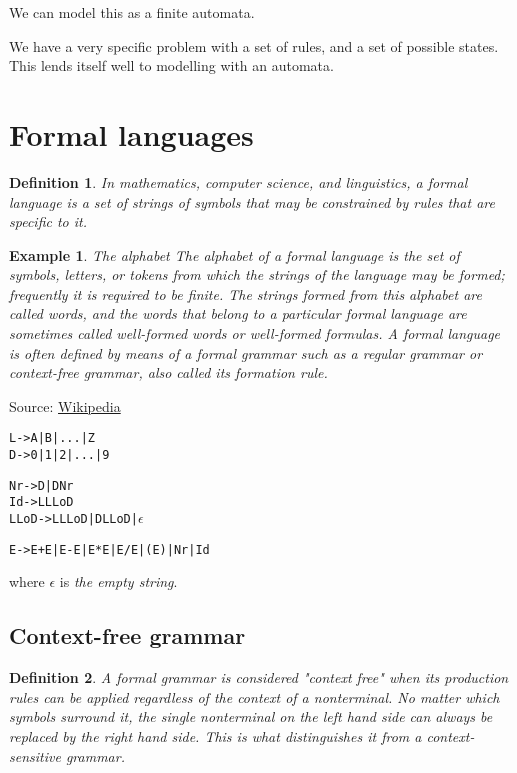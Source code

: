 \documentclass{article}
\newtheorem{definition}{Definition}[section]
\newtheorem{example}{Example}[section]
\begin{document}
We can model this as a finite automata.

We have a very specific problem with a set of rules, and a set of possible states. This lends itself well to modelling with an automata.

\section{Formal languages}

\begin{definition}
    In mathematics, computer science, and linguistics, a formal language is a set of strings of symbols that may be constrained by rules that are specific to it.
\end{definition}

\begin{example}{The alphabet}
    The alphabet of a formal language is the set of symbols, letters, or tokens from which the strings of the language may be formed; frequently it is required to be finite. The strings formed from this alphabet are called words, and the words that belong to a particular formal language are sometimes called well-formed words or well-formed formulas. A formal language is often defined by means of a formal grammar such as a regular grammar or context-free grammar, also called its formation rule.
\end{example}

Source: \href{https://en.wikipedia.org/wiki/Formal_language}{Wikipedia}

\begin{alltt}
    L -> A | B | ... | Z
    D -> 0 | 1 | 2 | ... | 9

    Nr -> D | D Nr
    Id -> L LLoD
    LLoD -> L LLoD | D LLoD | \( \epsilon \)

    E -> E + E | E - E | E * E | E / E | (E) | Nr | Id
\end{alltt}

where $ \epsilon $ is \textit{the empty string}.

\subsection{Context-free grammar}

\begin{definition}
    A formal grammar is considered "context free" when its production rules can be applied regardless of the context of a nonterminal. No matter which symbols surround it, the single nonterminal on the left hand side can always be replaced by the right hand side. This is what distinguishes it from a context-sensitive grammar.
\end{definition}
\end{document}
